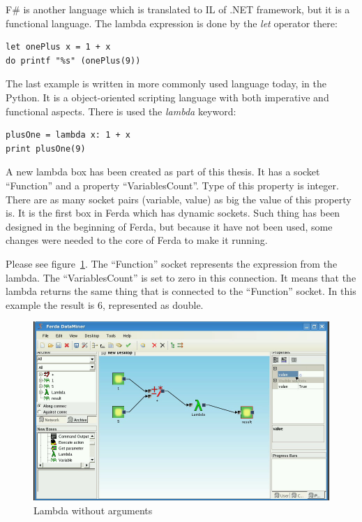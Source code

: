 \documentclass[a4paper,12pt]{book}
\begin{document}
F\# is another language which is translated to IL of .NET framework, but it is a functional language. The lambda expression is done by the \emph{let} operator there:
\begin{verbatim}
let onePlus x = 1 + x
do printf "%s" (onePlus(9)) 
\end{verbatim}

The last example is written in more commonly used language today, in the Python. It is a object-oriented scripting language with both imperative and functional aspects. There is used the \emph{lambda} keyword:
\begin{verbatim}
plusOne = lambda x: 1 + x
print plusOne(9)
\end{verbatim}

A new lambda box has been created as part of this thesis. It has a socket ``Function'' and a property ``VariablesCount''. Type of this property is integer. There are as many socket pairs (variable, value) as big the value of this property is. It is the first box in Ferda which has dynamic sockets. Such thing has been designed in the beginning of Ferda, but because it have not been used, some changes were needed to the core of Ferda to make it running.

Please see figure~\ref{fig:boxLambdaBasic}. The ``Function'' socket represents the expression from the lambda. The ``VariablesCount'' is set to zero in this connection. It means that the lambda returns the same thing that is connected to the ``Function'' socket. In this example the result is 6, represented as double. 
\begin{figure}
	\includegraphics[width=1\textwidth]{lambdaBasic2.png}
	\caption{Lambda without arguments}
	\label{fig:boxLambdaBasic}
\end{figure}
\end{document}
